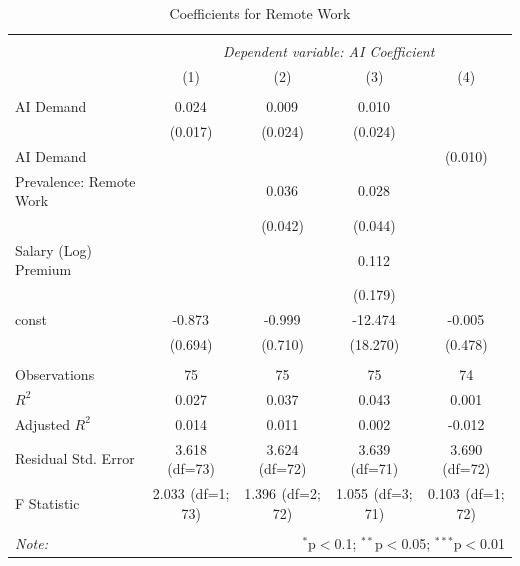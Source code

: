 \begin{table}[!htbp] \centering
  \caption{Coefficients for Remote Work}
\begin{tabular}{@{\extracolsep{5pt}}lcccc}
\\[-1.8ex]\hline
\hline \\[-1.8ex]
& \multicolumn{4}{c}{\textit{Dependent variable: AI Coefficient}} \
\cr \cline{2-5}
\\[-1.8ex] & (1) & (2) & (3) & (4) \\
\hline \\[-1.8ex]
 AI Demand & 0.024$^{}$ & 0.009$^{}$ & 0.010$^{}$ & \\
& (0.017) & (0.024) & (0.024) & \\
 AI Demand %
& & & & (0.010) \\
 Prevalence: Remote Work & & 0.036$^{}$ & 0.028$^{}$ & \\
& & (0.042) & (0.044) & \\
 Salary (Log) Premium & & & 0.112$^{}$ & \\
& & & (0.179) & \\
 const & -0.873$^{}$ & -0.999$^{}$ & -12.474$^{}$ & -0.005$^{}$ \\
& (0.694) & (0.710) & (18.270) & (0.478) \\
\hline \\[-1.8ex]
 Observations & 75 & 75 & 75 & 74 \\
 $R^2$ & 0.027 & 0.037 & 0.043 & 0.001 \\
 Adjusted $R^2$ & 0.014 & 0.011 & 0.002 & -0.012 \\
 Residual Std. Error & 3.618 (df=73) & 3.624 (df=72) & 3.639 (df=71) & 3.690 (df=72) \\
 F Statistic & 2.033$^{}$ (df=1; 73) & 1.396$^{}$ (df=2; 72) & 1.055$^{}$ (df=3; 71) & 0.103$^{}$ (df=1; 72) \\
\hline
\hline \\[-1.8ex]
\textit{Note:} & \multicolumn{4}{r}{$^{*}$p$<$0.1; $^{**}$p$<$0.05; $^{***}$p$<$0.01} \\
\end{tabular}
\end{table}